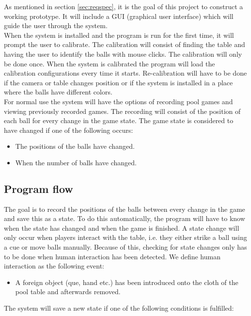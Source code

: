 As mentioned in section \ref{sec:reqspec}, it is the goal of this project to construct a working prototype. It will include a GUI (graphical user interface) which will guide the user through the system.\\

When the system is installed and the program is run for the first time, it will prompt the user to calibrate. The calibration will consist of finding the table and having the user to identify the balls with mouse clicks. The calibration will only be done once. When the system is calibrated the program will load the calibration configurations every time it starts. Re-calibration will have to be done if the camera or table changes position or if the system is installed in a place where the balls have different colors.\\

For normal use the system will have the options of recording pool games and viewing previously recorded games. The recording will consist of the position of each ball for every change in the game state. The game state is considered to have changed if one of the following occurs:\\ 
\begin{itemize}
	\item The positions of the balls have changed.
	\item When the number of balls have changed.
\end{itemize}

\subsection{Program flow}
The goal is to record the positions of the balls between every change in the game and save this as a state. To do this automatically, the program will have to know when the state has changed and when the game is finished. A state change will only occur when players interact with the table, i.e. they either strike a ball using a cue or move balls manually. Because of this, checking for state changes only has to be done when human interaction has been detected. We define human interaction as the following event:
\begin{itemize}
	\item  A foreign object (que, hand etc.) has been introduced onto the cloth of the pool table and afterwards removed.
\end{itemize}

The system will save a new state if one of the following conditions is fulfilled:

